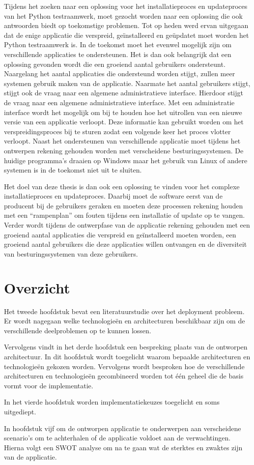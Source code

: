 Tijdens het zoeken naar een oplossing voor het installatieproces en updateproces van het Python testraamwerk, moet gezocht worden naar een oplossing die ook antwoorden biedt op toekomstige problemen.
Tot op heden werd ervan uitgegaan dat de enige applicatie die verspreid, geïnstalleerd en geüpdatet moet worden het Python testraamwerk is.
In de toekomst moet het evenwel mogelijk zijn om verschillende applicaties te ondersteunen.
Het is dan ook belangrijk dat een oplossing gevonden wordt die een groeiend aantal gebruikers ondersteunt.
Naargelang het aantal applicaties die ondersteund worden stijgt, zullen meer systemen gebruik maken van de applicatie.
Naarmate het aantal gebruikers stijgt, stijgt ook de vraag naar een algemene administratieve interface.
Hierdoor stijgt de vraag naar een algemene administratieve interface. 
Met een administratie interface wordt het mogelijk om bij te houden hoe het uitrollen van een nieuwe versie van een applicatie verloopt.
Deze informatie kan gebruikt worden om het verspreidingsproces bij te sturen zodat een volgende keer het proces vlotter verloopt.
Naast het ondersteunen van verschillende applicatie moet tijdens het ontwerpen rekening gehouden worden met verscheidene besturingssystemen.
De huidige programma's draaien op Windows maar het gebruik van Linux of andere systemen is in de toekomst niet uit te sluiten.

Het doel van deze thesis is dan ook een oplossing te vinden voor het complexe installatieproces en updateproces.
Daarbij moet de software eerst van de producent bij de gebruikers geraken en moeten deze processen rekening houden met een ``rampenplan'' om fouten tijdens een installatie of update op te vangen.
Verder wordt tijdens de ontwerpfase van de applicatie rekening gehouden met een groeiend aantal applicaties die verspreid en geïnstalleerd moeten worden, een groeiend aantal gebruikers die deze applicaties willen ontvangen en de diversiteit van besturingssystemen van deze gebruikers.

\section{Overzicht}
Het tweede hoofdstuk bevat een literatuurstudie over het deployment probleem.
Er wordt nagegaan welke technologieën en architecturen beschikbaar zijn om de verschillende deelproblemen op te kunnen lossen.

Vervolgens vindt in het derde hoofdstuk een bespreking plaats van de ontworpen architectuur.
In dit hoofdstuk wordt toegelicht waarom bepaalde architecturen en technologieën gekozen worden.
Vervolgens wordt besproken hoe de verschillende architecturen en technologieën gecombineerd worden tot één geheel die de basis vormt voor de implementatie.

In het vierde hoofdstuk worden implementatiekeuzes toegelicht en soms uitgediept.

In hoofdstuk vijf om de ontworpen applicatie te onderwerpen aan verscheidene scenario's om te achterhalen of de applicatie voldoet aan de verwachtingen.
Hierna volgt een SWOT analyse om na te gaan wat de sterktes en zwaktes zijn van de applicatie.

